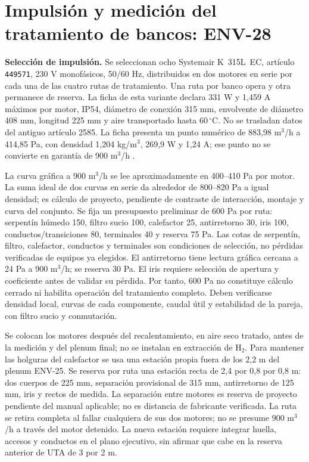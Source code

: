 \section{Impulsión y medición del tratamiento de bancos: ENV-28}
\label{sec:ambiente-env28}
\textbf{Selección de impulsión.} Se seleccionan ocho Systemair K~315L~EC, artículo \texttt{449571}, 230 V monofásicos, 50/60 Hz, distribuidos en dos motores en serie por cada una de las cuatro rutas de tratamiento. Una ruta por banco opera y otra permanece de reserva. La ficha de esta variante declara 331 W y 1,459 A máximos por motor, IP54, diámetro de conexión 315 mm, envolvente de diámetro 408 mm, longitud 225 mm y aire transportado hasta 60\,$^{\circ}$C. No se trasladan datos del antiguo artículo 2585. La ficha presenta un punto numérico de 883,98 m$^3$/h a 414,85 Pa, con densidad 1,204 kg/m$^3$, 269,9 W y 1,24 A; ese punto no se convierte en garantía de 900 m$^3$/h \parencite[pp.~1--2]{lote28-k315}.

La curva gráfica a 900 m$^3$/h se lee aproximadamente en 400--410 Pa por motor. La suma ideal de dos curvas en serie da alrededor de 800--820 Pa a igual densidad; es cálculo de proyecto, pendiente de contraste de interacción, montaje y curva del conjunto. Se fija un presupuesto preliminar de 600 Pa por ruta: serpentín húmedo 150, filtro sucio 100, calefactor 25, antirretorno 30, iris 100, conductos/transiciones 80, terminales 40 y reserva 75 Pa. Las cotas de serpentín, filtro, calefactor, conductos y terminales son condiciones de selección, no pérdidas verificadas de equipos ya elegidos. El antirretorno tiene lectura gráfica cercana a 24 Pa a 900 m$^3$/h; se reserva 30 Pa. El iris requiere selección de apertura y coeficiente antes de validar su pérdida. Por tanto, 600 Pa no constituye cálculo cerrado ni habilita operación del tratamiento completo. Deben verificarse densidad local, curvas de cada componente, caudal útil y estabilidad de la pareja, con filtro sucio y conmutación.

Se colocan los motores después del recalentamiento, en aire seco tratado, antes de la medición y del plenum final; no se instalan en extracción de H$_2$. Para mantener las holguras del calefactor se usa una estación propia fuera de los 2,2 m del plenum ENV-25. Se reserva por ruta una estación recta de 2,4 por 0,8 por 0,8 m: dos cuerpos de 225 mm, separación provisional de 315 mm, antirretorno de 125 mm, iris y rectos de medida. La separación entre motores es reserva de proyecto pendiente del manual aplicable; no es distancia de fabricante verificada. La ruta se retira completa al fallar cualquiera de sus dos motores; no se presume 900 m$^3$/h a través del motor detenido. La nueva estación requiere integrar huella, accesos y conductos en el plano ejecutivo, sin afirmar que cabe en la reserva anterior de UTA de 3 por 2 m.

